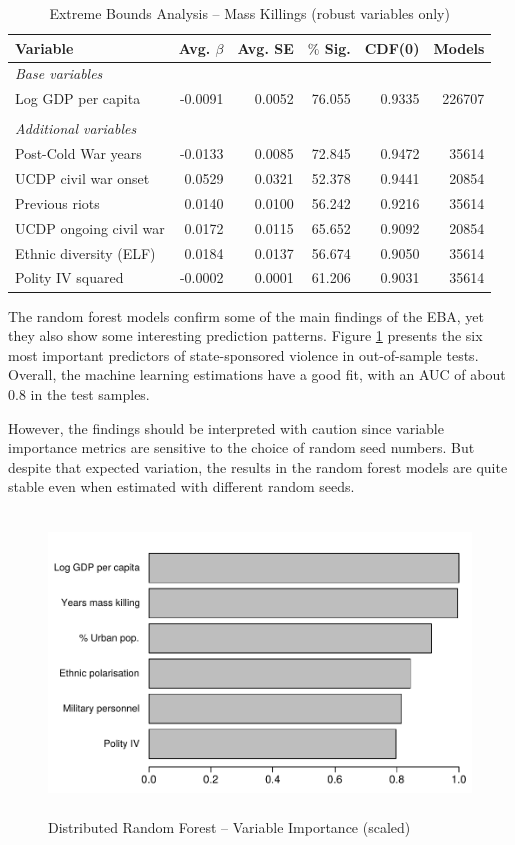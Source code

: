 \begin{table}[H]
\centering
\begin{tabular}{lrrrrr}
\hline
\textbf{Variable} & \textbf{Avg. $\beta$} & \textbf{Avg. SE} & \textbf{$\%$ Sig.} & \textbf{CDF(0)} & \textbf{Models} \\ \hline
\textit{Base variables} &  &  &  &  &  \\
Log GDP per capita & -0.0091 & 0.0052 & 76.055 & 0.9335 & 226707 \\
 &  &  &  &  &  \\
\textit{Additional variables} &  &  &  &  &  \\
Post-Cold War years & -0.0133 & 0.0085 & 72.845 & 0.9472 & 35614 \\
UCDP civil war onset & 0.0529 & 0.0321 & 52.378 & 0.9441 & 20854 \\
Previous riots & 0.0140 & 0.0100 & 56.242 & 0.9216 & 35614 \\
UCDP ongoing civil war & 0.0172 & 0.0115 & 65.652 & 0.9092 & 20854 \\
Ethnic diversity (ELF) & 0.0184 & 0.0137 & 56.674 & 0.9050 & 35614 \\
Polity IV squared & -0.0002 & 0.0001 & 61.206 & 0.9031 & 35614 \\ \hline
\end{tabular}
\caption{Extreme Bounds Analysis -- Mass Killings (robust variables only)}
\label{tab:eba1}
\end{table}

The random forest models confirm some of the main findings of the EBA, yet they also show some interesting prediction patterns. Figure \ref{fig:drfuv} presents the six most important predictors of state-sponsored violence in out-of-sample tests. Overall, the machine learning estimations have a good fit, with an AUC of about 0.8 in the test samples.

However, the findings should be interpreted with caution since variable importance metrics are sensitive to the choice of random seed numbers. But despite that expected variation, the results in the random forest models are quite stable even when estimated with different random seeds. 

\begin{figure}[h]
\includegraphics[width=.9\textwidth, height=8cm]{images/drf.pdf}
\caption{Distributed Random Forest -- Variable Importance (scaled)}
\label{fig:drfuv}
\end{figure}

